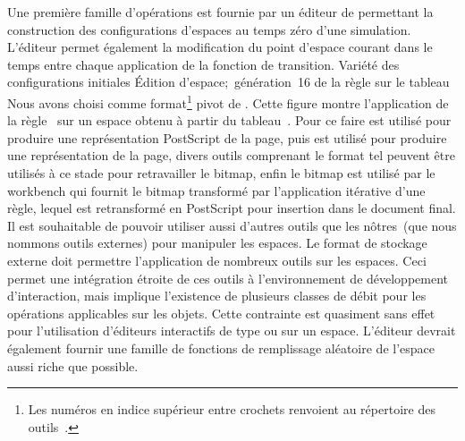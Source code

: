 Une premi\`ere famille d'op\'erations est fournie par un \'editeur de
permettant la construction des configurations d'espaces
au temps z\'ero d'une simulation. %
L'\'editeur permet \'egalement la modification du point d'espace courant
dans le temps entre chaque application de la fonction de transition.
%
{Vari\'et\'e des configurations initiales}%
{\'Edition d'espace;~g\'en\'eration~16 de la r\`egle  sur le
  tableau~}%
{Nous avons choisi  comme format\footnote{%
    Les num\'eros en indice sup\'erieur entre crochets renvoient au
    r\'epertoire des outils~.} %
  pivot de . %
  Cette figure montre l'application de la r\`egle~ sur
  un espace obtenu \`a partir du tableau~. %
  Pour ce faire  est utilis\'e pour produire une
  repr\'esentation PostScript de la page, puis 
  est utilis\'e pour produire une repr\'esentation  de la page,
  divers outils comprenant le format  tel 
  peuvent \^etre utilis\'es \`a ce stade pour retravailler le bitmap, enfin
  le bitmap est utilis\'e par le workbench qui fournit le bitmap
  transform\'e par l'application it\'erative d'une r\`egle, lequel est
  retransform\'e en PostScript pour insertion dans le document final.}
Il est souhaitable de pouvoir utiliser aussi d'autres outils que les
n\^otres~(que nous nommons outils externes) pour manipuler les espaces. %
Le format de stockage externe doit permettre l'application
 de nombreux outils
sur les espaces. %
Ceci permet une int\'egration \'etroite de ces outils \`a l'environnement de
d\'eveloppement  d'interaction, mais implique l'existence de
plusieurs classes de d\'ebit pour les op\'erations applicables sur les
objets. %
Cette contrainte est quasiment sans effet pour l'utilisation
d'\'editeurs interactifs de type  %
ou  %
sur un espace.
L'\'editeur devrait \'egalement fournir une famille de fonctions de
remplissage al\'eatoire de l'espace aussi riche que possible.

